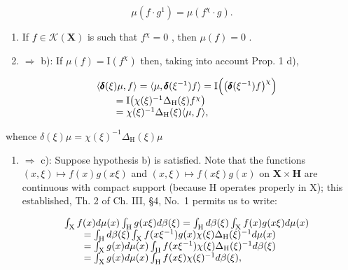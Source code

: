 \[
\mu (f \cdot g ^ {1}) = \mu (f ^ {\chi} \cdot g).\tag{2}
\]

\begin{enumerate}
\def\labelenumi{\alph{enumi})}
\setcounter{enumi}{3}
\item
  If \(f \in \mathcal{K}(\mathbf{X})\) is such that \(f^{\chi} = 0\) , then \(\mu(f) = 0\) .
\item
  \(\Rightarrow\) b): If \(\mu(f)=\mathrm{I}(f^{\chi})\) then, taking into account Prop. 1 d),
\end{enumerate}

\[
\begin{array}{r l} & {\langle \pmb {\delta} (\xi) \mu , f \rangle = \langle \mu , \pmb {\delta} (\xi^ {- 1}) f \rangle = \mathrm{I} \Big (\big (\pmb {\delta} (\xi^ {- 1}) f \big) ^ {\chi} \Big)} \\ & {\qquad = \mathrm{I} \big (\chi (\xi) ^ {- 1} \Delta_ {\mathrm{H}} (\xi) f ^ {\chi} \big)} \\ & {\qquad = \chi (\xi) ^ {- 1} \Delta_ {\mathrm{H}} (\xi) \langle \mu , f \rangle ,} \end{array}
\]

whence \(\delta (\xi)\mu = \chi (\xi)^{-1}\Delta_{\mathrm{H}}(\xi)\mu\)

\begin{enumerate}
\def\labelenumi{\alph{enumi})}
\setcounter{enumi}{1}
\tightlist
\item
  \(\Rightarrow\) c): Suppose hypothesis b) is satisfied. Note that the functions \((x,\xi)\mapsto f(x)g(x\xi)\) and \((x,\xi)\mapsto f(x\xi)g(x)\) on \(\mathbf{X}\times\mathbf{H}\) are continuous with compact support (because H operates properly in X); this established, Th. 2 of Ch. III, §4, No.~1 permits us to write:
\end{enumerate}

\[
\begin{array}{r l} & {\int_ {\mathrm{X}} f (x) d \mu (x) \int_ {\mathrm{H}} g (x \xi) d \beta (\xi) = \int_ {\mathrm{H}} d \beta (\xi) \int_ {\mathrm{X}} f (x) g (x \xi) d \mu (x)} \\ & {\qquad = \int_ {\mathrm{H}} d \beta (\xi) \int_ {\mathrm{X}} f (x \xi^ {- 1}) g (x) \chi (\xi) \Delta_ {\mathrm{H}} (\xi) ^ {- 1} d \mu (x)} \\ & {\qquad = \int_ {\mathrm{X}} g (x) d \mu (x) \int_ {\mathrm{H}} f (x \xi^ {- 1}) \chi (\xi) \Delta_ {\mathrm{H}} (\xi) ^ {- 1} d \beta (\xi)} \\ & {\qquad = \int_ {\mathrm{X}} g (x) d \mu (x) \int_ {\mathrm{H}} f (x \xi) \chi (\xi) ^ {- 1} d \beta (\xi),} \end{array}
\]

